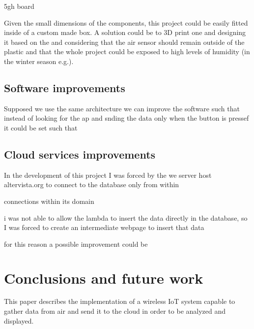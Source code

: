 \documentclass[conference]{IEEEtran}
\begin{document}
		5gh board
		
		Given the small dimensions of the components, this project could be easily fitted inside of a custom made box.
		A solution could be to 3D print one and designing it based on the and considering that the air sensor should remain outside of the plastic and that the whole project could be exposed to high levels of humidity (in the winter season e.g.).
	
	\subsection{Software improvements}
	
		Supposed we use the same architecture we can improve the software such that instead of looking for the ap and snding the data only when the button is pressef it could be set such that 
		
	\subsection{Cloud services improvements}
	
		In the development of this project I was forced by the we server host altervista.org to connect to the database only from within
		
		connections within its domain
		
		i was not able to allow the lambda to insert the data directly in the database, so I was forced to create an intermediate webpage to insert that data
		
		for this reason a possible improvement could be 

\section{Conclusions and future work}
This paper describes the implementation of a wireless IoT system capable to gather data from air and send it to the cloud in order to be analyzed and displayed.
\end{document}
